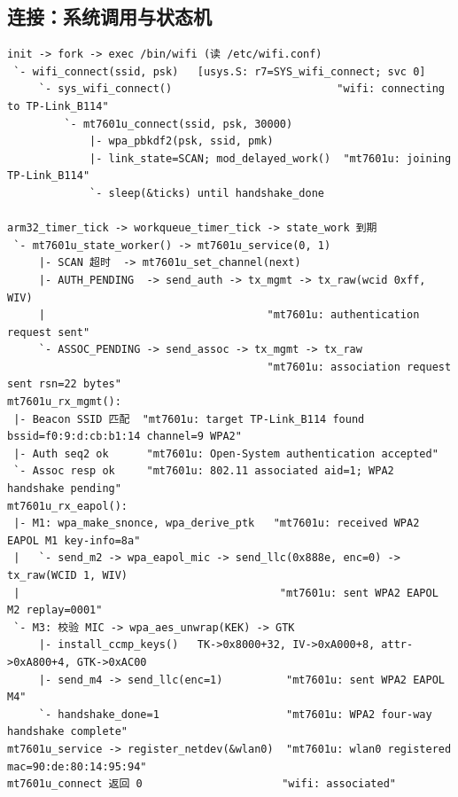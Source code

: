 \subsection{连接：系统调用与状态机}
\begin{lstlisting}
init -> fork -> exec /bin/wifi (读 /etc/wifi.conf)
 `- wifi_connect(ssid, psk)   [usys.S: r7=SYS_wifi_connect; svc 0]
     `- sys_wifi_connect()                          "wifi: connecting to TP-Link_B114"
         `- mt7601u_connect(ssid, psk, 30000)
             |- wpa_pbkdf2(psk, ssid, pmk)
             |- link_state=SCAN; mod_delayed_work()  "mt7601u: joining TP-Link_B114"
             `- sleep(&ticks) until handshake_done

arm32_timer_tick -> workqueue_timer_tick -> state_work 到期
 `- mt7601u_state_worker() -> mt7601u_service(0, 1)
     |- SCAN 超时  -> mt7601u_set_channel(next)
     |- AUTH_PENDING  -> send_auth -> tx_mgmt -> tx_raw(wcid 0xff, WIV)
     |                                   "mt7601u: authentication request sent"
     `- ASSOC_PENDING -> send_assoc -> tx_mgmt -> tx_raw
                                         "mt7601u: association request sent rsn=22 bytes"
mt7601u_rx_mgmt():
 |- Beacon SSID 匹配  "mt7601u: target TP-Link_B114 found bssid=f0:9:d:cb:b1:14 channel=9 WPA2"
 |- Auth seq2 ok      "mt7601u: Open-System authentication accepted"
 `- Assoc resp ok     "mt7601u: 802.11 associated aid=1; WPA2 handshake pending"
mt7601u_rx_eapol():
 |- M1: wpa_make_snonce, wpa_derive_ptk   "mt7601u: received WPA2 EAPOL M1 key-info=8a"
 |   `- send_m2 -> wpa_eapol_mic -> send_llc(0x888e, enc=0) -> tx_raw(WCID 1, WIV)
 |                                         "mt7601u: sent WPA2 EAPOL M2 replay=0001"
 `- M3: 校验 MIC -> wpa_aes_unwrap(KEK) -> GTK
     |- install_ccmp_keys()   TK->0x8000+32, IV->0xA000+8, attr->0xA800+4, GTK->0xAC00
     |- send_m4 -> send_llc(enc=1)          "mt7601u: sent WPA2 EAPOL M4"
     `- handshake_done=1                    "mt7601u: WPA2 four-way handshake complete"
mt7601u_service -> register_netdev(&wlan0)  "mt7601u: wlan0 registered mac=90:de:80:14:95:94"
mt7601u_connect 返回 0                      "wifi: associated"
\end{lstlisting}

